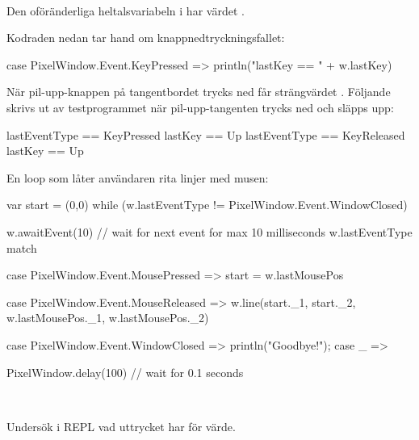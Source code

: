 \SOLUTION

\TaskSolved \what~

\SubtaskSolved Den oföränderliga heltalsvariabeln  i  har värdet .

\SubtaskSolved Kodraden nedan tar hand om knappnedtryckningsfallet:
\begin{Code}
case PixelWindow.Event.KeyPressed => println("lastKey == " + w.lastKey)
\end{Code}

\SubtaskSolved När pil-upp-knappen på tangentbordet trycks ned får  strängvärdet . Följande skrivs ut av testprogrammet när pil-upp-tangenten trycks ned och släpps upp:
\begin{REPL}
lastEventType == KeyPressed
lastKey == Up
lastEventType == KeyReleased
lastKey == Up
\end{REPL}


\SubtaskSolved En loop som låter användaren rita linjer med musen:
\begin{Code}
var start = (0,0)
while (w.lastEventType != PixelWindow.Event.WindowClosed) {
  w.awaitEvent(10)  // wait for next event for max 10 milliseconds
  w.lastEventType match {
    case PixelWindow.Event.MousePressed  =>
      start = w.lastMousePos

    case PixelWindow.Event.MouseReleased =>
      w.line(start._1, start._2, w.lastMousePos._1, w.lastMousePos._2)

    case PixelWindow.Event.WindowClosed  =>
       println("Goodbye!");
    case _ =>
  }
  PixelWindow.delay(100) // wait for 0.1 seconds
}
\end{Code}

\QUESTEND


\clearpage

\ExtraTasks %




\QUESTBEGIN

\Task  \what~

\Subtask Undersök i REPL vad uttrycket  har för värde.

